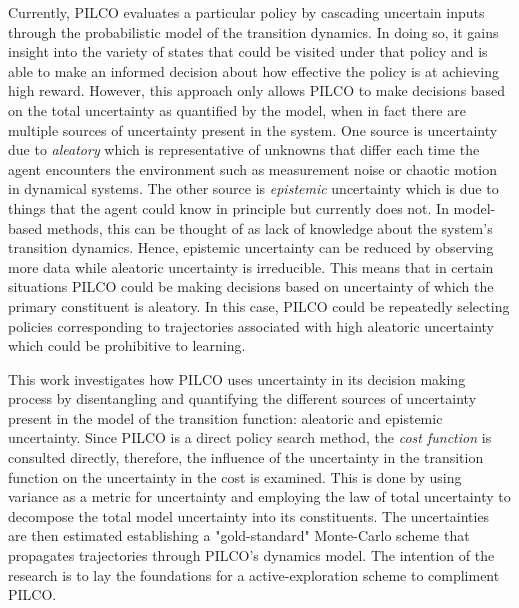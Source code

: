 Currently, PILCO evaluates a particular policy by cascading uncertain inputs through the probabilistic model of the transition dynamics. In doing so, it gains insight into the variety of states that could be visited under that policy and is able to make an informed decision about how effective the policy is at achieving high reward. However, this approach only allows PILCO to make decisions based on the total uncertainty as quantified by the model, when in fact there are multiple sources of uncertainty present in the system. One source is uncertainty due to \textit{aleatory} which is representative of unknowns that differ each time the agent encounters the environment such as measurement noise or chaotic motion in dynamical systems. The other source is \textit{epistemic} uncertainty which is due to things that the agent could know in principle but currently does not. In model-based methods, this can be thought of as lack of knowledge about the system's transition dynamics. Hence, epistemic uncertainty can be reduced by observing more data while aleatoric uncertainty is irreducible. This means that in certain situations PILCO could be making decisions based on uncertainty of which the primary constituent is aleatory. In this case, PILCO could be repeatedly selecting policies corresponding to trajectories associated with high aleatoric uncertainty which could be prohibitive to learning.

This work investigates how PILCO uses uncertainty in its decision making process by disentangling and quantifying the different sources of uncertainty present in the model of the transition function: aleatoric and epistemic uncertainty. Since PILCO is a direct policy search method, the \textit{cost function} is consulted directly, therefore, the influence of the uncertainty in the transition function on the uncertainty in the cost is examined. This is done by using variance as a metric for uncertainty and employing the law of total uncertainty to decompose the total model uncertainty into its constituents. The uncertainties are then estimated establishing a "gold-standard" Monte-Carlo scheme that propagates trajectories through PILCO's dynamics model. The intention of the research is to lay the foundations for a active-exploration scheme to compliment PILCO. 



